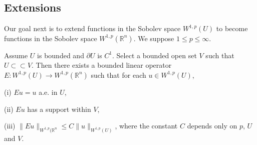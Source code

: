 \subsection{Extensions}
Our goal next is to extend functions in the Sobolev space $W^{1,p}(U)$ to become functions in the Sobolev space $W^{1,p}(\mathbb{R}^n)$. We suppose $1\le p\le\infty$.
\begin{theorem}
Assume $U$ is bounded and $\partial U$ is $C^1$. Select a bounded open set $V$ such that $U\subset\subset V$. Then there exists a bounded linear operator $E:W^{1,p}(U)\to W^{1,p}(\mathbb{R}^n)$ such that for each $u\in W^{1,p}(U)$,\par
(i) $Eu=u$ a.e. in $U$,\par
(ii) $Eu$ has a support within $V$,\par
(iii) $\|Eu\|_{W^{1,p}(\mathbb{R}^n}\le C\|u\|_{W^{1,p}(U)}$, where the constant $C$ depends only on $p$, $U$ and $V$.
\end{theorem}
